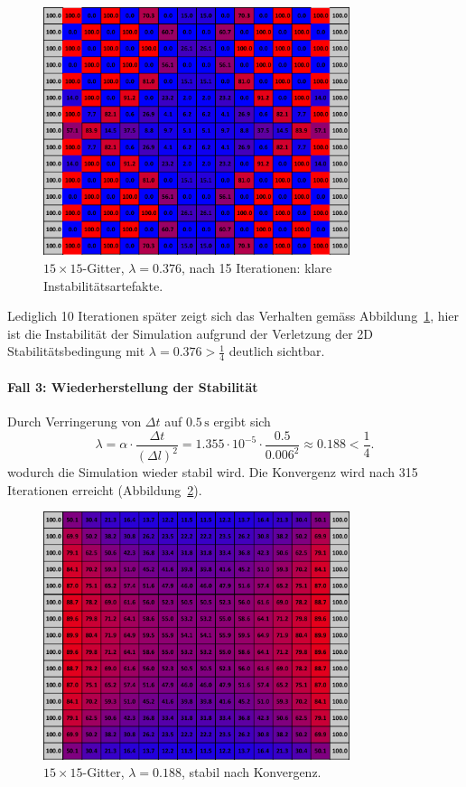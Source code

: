 \begin{figure}[htbp]
	\centering
	\includegraphics[width=0.8\textwidth]{papers/parallelisierung/images/simulation_15x15_0.376_15it.pdf}
	\caption{\(15\times 15\)-Gitter, \(\lambda = 0.376\), nach 15 Iterationen: klare Instabilitätsartefakte.}
	\label{parallelisierung:fig:simulation_15x15_0.376_15it}
\end{figure}

Lediglich 10 Iterationen später zeigt sich das Verhalten gemäss Abbildung~\ref{parallelisierung:fig:simulation_15x15_0.376_15it}, hier ist die Instabilität der Simulation aufgrund der Verletzung der 2D Stabilitätsbedingung mit \(\lambda = 0.376 > \frac{1}{4}\) deutlich sichtbar.

\paragraph{Fall 3: Wiederherstellung der Stabilität}  
Durch Verringerung von \(\Delta t\) auf \(0.5\,\mathrm{s}\) ergibt sich
\[
\lambda =
\alpha \cdot \frac{\Delta t}{(\Delta l)^2}
=
1.355\cdot 10^{-5} \cdot \frac{0.5}{0.006^2}
\approx 0.188 < \frac14.
\]
wodurch die Simulation wieder stabil wird. Die Konvergenz wird nach 315 Iterationen erreicht (Abbildung~\ref{parallelisierung:fig:simulation_15x15_0.188_konv}).

\begin{figure}[htbp]
	\centering
	\includegraphics[width=0.8\textwidth]{papers/parallelisierung/images/simulation_15x15_0.188_konv.pdf}
	\caption{\(15\times 15\)-Gitter, \(\lambda = 0.188\), stabil nach Konvergenz.}
	\label{parallelisierung:fig:simulation_15x15_0.188_konv}
\end{figure}

